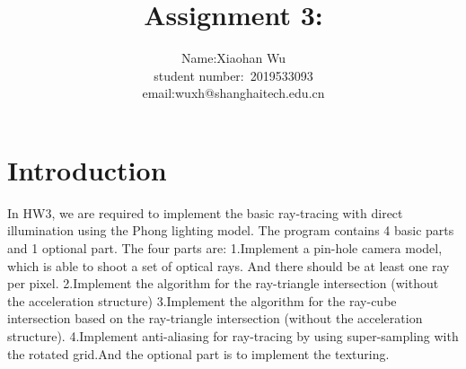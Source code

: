 \documentclass[acmtog]{acmart}
\title{Assignment 3:\\ {}}
\author{Name:\quad Xiaohan Wu  \\ student number:\ 2019533093
\\email:\quad wuxh@shanghaitech.edu.cn}
\begin{document}
\maketitle

\vspace*{2 ex}

\section{Introduction}
\qquad In HW3, we are required to implement the basic ray-tracing with direct illumination using the Phong lighting model. The program contains 4 basic parts and 1 optional part. The four parts are: 1.Implement a pin-hole camera model, which is able to shoot a set of optical rays. And there should be at least one ray per pixel.
2.Implement the algorithm for the ray-triangle intersection (without the acceleration structure)
3.Implement the algorithm for the ray-cube intersection based on the ray-triangle intersection (without the acceleration structure). 
4.Implement anti-aliasing for ray-tracing by using super-sampling with the rotated grid.And the optional part is to implement the texturing.
\end{document}
